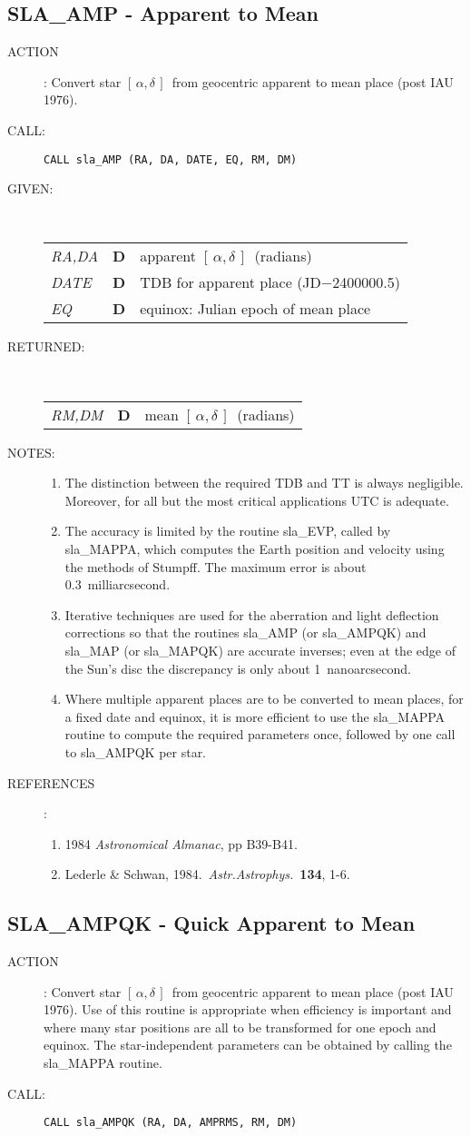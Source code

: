 \documentclass[11pt,twoside]{article}
\newcommand{\xlabel}[1]{}
\newcommand{\radec}     {$[\,\alpha,\delta\,]$}
\newcommand{\routine}[3]
{\hbadness=10000
  \vbox
  {
    \rule{\textwidth}{0.3mm}\\
    {\Large {\bf #1} \hfill #2 \hfill {\bf #1}}\\
    \setlength{\oldspacing}{\topsep}
    \setlength{\topsep}{0.3ex}
    \begin{description}
      #3
    \end{description}
    \setlength{\topsep}{\oldspacing}
  }
}
\renewcommand{\routine}[3]
   {
      \subsection{#1\xlabel{#1} - #2\label{#1}}
       \begin{description}
         #3
       \end{description}
   }
\newcommand{\action}[1]
{\item[ACTION]: #1}
\newcommand{\action}[1]
   {\item[ACTION:] #1}
\newcommand{\call}[1]
{\item[CALL]: \hspace{0.4em}{\tt #1}}
\newlength{\oldspacing}
\renewcommand{\call}[1]
   {
    \item[CALL:] {\tt #1}
   }
\newcommand{\args}[2]
{
  \goodbreak
  \setlength{\oldspacing}{\topsep}
  \setlength{\topsep}{0.3ex}
  \begin{description}
  \item[#1]:\\[1.5ex]
    \begin{tabular}{p{7em}p{6em}p{22em}}
      #2
    \end{tabular}
  \end{description}
  \setlength{\topsep}{\oldspacing}
}
\renewcommand{\args}[2]
   {
     \begin{description}
        \item[#1:]\\
        \begin{tabular}{p{7em}p{6em}l}
           #2
        \end{tabular}
     \end{description}
   }
\newcommand{\spec}[3]
{
  {\em {#1}} & {\bf \mbox{#2}} & {#3}
}
\newcommand{\notes}[1]
{
  \goodbreak
  \setlength{\oldspacing}{\topsep}
  \setlength{\topsep}{0.3ex}
  \begin{description}
    \item[NOTES]:
        #1
  \end{description}
  \setlength{\topsep}{\oldspacing}
}
\renewcommand{\notes}[1]
   {
      \begin{description}
         \item[NOTES:]
            #1
      \end{description}
   }
\newcommand{\refs}[1]
{
  \goodbreak
  \setlength{\oldspacing}{\topsep}
  \setlength{\topsep}{0.3ex}
  \begin{description}
    \item[REFERENCES]:
        #1
  \end{description}
  \setlength{\topsep}{\oldspacing}
}
\newcommand{\refs}[1]
   {
     \begin{description}
       \item[REFERENCES:]
           #1
     \end{description}
   }
\begin{document}
\routine{SLA\_AMP}{Apparent to Mean}
{
 \action{Convert star \radec\ from geocentric apparent to
         mean place (post IAU 1976).}
 \call{CALL sla\_AMP (RA, DA, DATE, EQ, RM, DM)}
}
\args{GIVEN}
{
 \spec{RA,DA}{D}{apparent \radec\ (radians)} \\
 \spec{DATE}{D}{TDB for apparent place (JD$-$2400000.5)} \\
 \spec{EQ}{D}{equinox:  Julian epoch of mean place}
}
\args{RETURNED}
{
 \spec{RM,DM}{D}{mean \radec\ (radians)}
}
\notes
{
 \begin{enumerate}
  \item The distinction between the required TDB and TT is
        always negligible.  Moreover, for all but the most
        critical applications UTC is adequate.
  \item The accuracy is limited by the routine sla\_EVP, called
        by sla\_MAPPA, which computes the Earth position and
        velocity using the methods of Stumpff.  The maximum
        error is about 0.3~milliarcsecond.
  \item Iterative techniques are used for the aberration and
        light deflection corrections so that the routines
        sla\_AMP (or sla\_AMPQK) and sla\_MAP (or sla\_MAPQK) are
        accurate inverses;  even at the edge of the Sun's disc
        the discrepancy is only about 1~nanoarcsecond.
  \item Where multiple apparent places are to be converted to
        mean places, for a fixed date and equinox, it is more
        efficient to use the sla\_MAPPA routine to compute the
        required parameters once, followed by one call to
        sla\_AMPQK per star.
 \end{enumerate}
}
\refs
{
 \begin{enumerate}
  \item 1984 {\it Astronomical Almanac}, pp B39-B41.
  \item Lederle \& Schwan, 1984.\ {\it Astr.Astrophys.}\ {\bf 134}, 1-6.
 \end{enumerate}
}
\routine{SLA\_AMPQK}{Quick Apparent to Mean}
{
 \action{Convert star \radec\ from geocentric apparent to mean place
         (post IAU 1976).  Use of this routine is appropriate when
         efficiency is important and where many star positions are
         all to be transformed for one epoch and equinox.  The
         star-independent parameters can be obtained by calling
         the sla\_MAPPA routine.}
 \call{CALL sla\_AMPQK (RA, DA, AMPRMS, RM, DM)}
}
\end{document}
